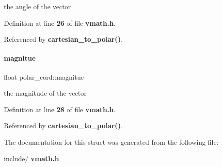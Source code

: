 the angle of the vector 



Definition at line \textbf{ 26} of file \textbf{ vmath.\+h}.



Referenced by \textbf{ cartesian\+\_\+to\+\_\+polar()}.

\mbox{\label{structpolar__cord_aec2e25fecc82af176f0fcd23f1e02f0c}} 
\paragraph{magnitue}
{\footnotesize\ttfamily float polar\+\_\+cord\+::magnitue}



the magnitude of the vector 



Definition at line \textbf{ 28} of file \textbf{ vmath.\+h}.



Referenced by \textbf{ cartesian\+\_\+to\+\_\+polar()}.



The documentation for this struct was generated from the following file\+:\begin{DoxyCompactItemize}
\item 
include/\textbf{ vmath.\+h}\end{DoxyCompactItemize}
